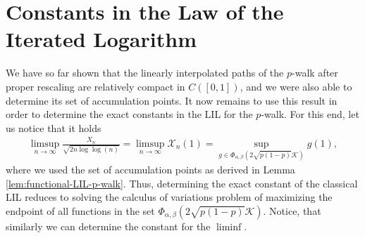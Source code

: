 \documentclass[11pt]{article}
\theoremstyle{remark}
\begin{document}
\section{Constants in the Law of the Iterated Logarithm}\label{sec:var}
We have so far shown that the linearly interpolated paths of the $p$-walk after proper rescaling are relatively compact in $C([0,1])$, and we were also able to determine its set of accumulation points. It now remains to use this result in order to determine the exact constants in the LIL for the $p$-walk. For this end, let us notice that it holds
\begin{align}\label{eq:supremum}
\limsup_{n\rightarrow\infty}\frac{X_n}{\sqrt{2n\log\log(n)}}=\limsup_{n\rightarrow\infty}\mathcal{X}_n(1)=\sup_{g\in\Phi_{\alpha,\beta}(2\sqrt{p(1-p)}\mathcal{K})}g(1),
\end{align}
where we used the set of accumulation points as derived in Lemma \ref{lem:functional-LIL-p-walk}. Thus, determining the exact constant of the classical LIL reduces to solving the calculus of variations problem of maximizing the endpoint of all functions in the set $\Phi_{\alpha,\beta}(2\sqrt{p(1-p)}\mathcal{K})$. Notice, that similarly we can determine the constant for the $\liminf$.
\end{document}

